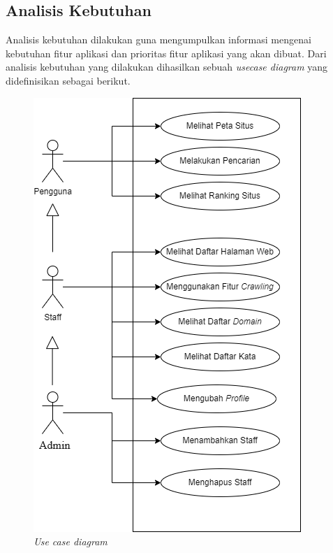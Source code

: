 \documentclass[
	a4paper, %
	10pt, %
	unnumberedsections, %
	twoside, %
]{LTJournalArticle}
\begin{document}
\subsection{Analisis Kebutuhan}
Analisis kebutuhan dilakukan guna mengumpulkan informasi mengenai kebutuhan fitur aplikasi dan prioritas fitur aplikasi yang akan dibuat. Dari analisis kebutuhan yang dilakukan dihasilkan sebuah \textit{usecase diagram} yang didefinisikan sebagai berikut.


\begin{figure}[H]
	\includegraphics[width=\linewidth]{usecase.png}
	\caption{\textit{Use case diagram}}
\end{figure}
\end{document}
